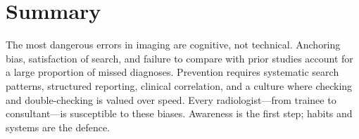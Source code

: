 \clearpage

\section{Summary}
The most dangerous errors in imaging are cognitive, not technical. Anchoring bias, satisfaction of search, and failure to compare with prior studies account for a large proportion of missed diagnoses. Prevention requires systematic search patterns, structured reporting, clinical correlation, and a culture where checking and double-checking is valued over speed. Every radiologist---from trainee to consultant---is susceptible to these biases. Awareness is the first step; habits and systems are the defence.

\clearpage
